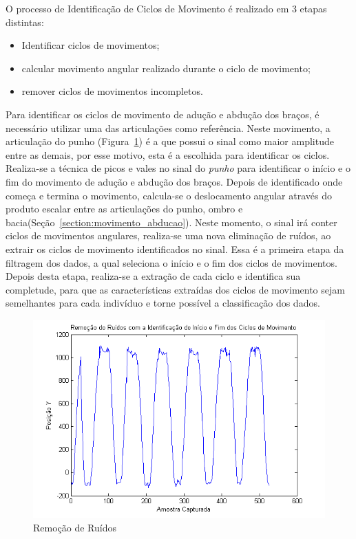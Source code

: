O processo de Identificação de Ciclos de Movimento é realizado em 3 etapas distintas:
\begin{itemize}
	\item Identificar ciclos de movimentos;
	\item calcular movimento angular realizado durante o ciclo de movimento;
	\item remover ciclos de movimentos incompletos.
\end{itemize}

Para identificar os ciclos de movimento de adução e abdução dos braços, é necessário utilizar uma das articulações como referência. Neste movimento, a articulação do punho (Figura~\ref{img:remocaoruidossinal}) é a que possui o sinal como maior amplitude entre as demais, por esse motivo, esta é a escolhida para identificar os ciclos. Realiza-se a técnica de picos e vales no sinal do \textit{punho} para identificar o início e o fim do movimento de adução e abdução dos braços. Depois de identificado onde começa e termina o movimento, calcula-se o deslocamento angular através do produto escalar entre as articulações do punho, ombro e bacia(Seção~\ref{section:movimento_abducao}). Neste momento, o sinal irá conter ciclos de movimentos angulares, realiza-se uma nova eliminação de ruídos, ao extrair os ciclos de movimento identificados no sinal. Essa é a primeira etapa da filtragem dos dados, a qual seleciona o início e o fim dos ciclos de movimentos. Depois desta etapa, realiza-se a extração de cada ciclo e 
identifica sua 
completude, para que as características extraídas dos ciclos de movimento sejam semelhantes para cada indivíduo e torne possível a classificação dos dados.

\begin{figure}[!htb]
     \centering
     \includegraphics[width=1\textwidth]{./img/remocaoruidociclo.png}
     \caption{Remoção de Ruídos}
     \label{img:remocaoruidossinal}
\end{figure}


